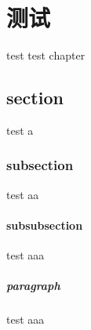 \chapter{测试}
test test chapter

\section{section}
test a
\subsection{subsection}
test aa
\subsubsection{subsubsection}
test aaa
\paragraph{paragraph}
test aaa
